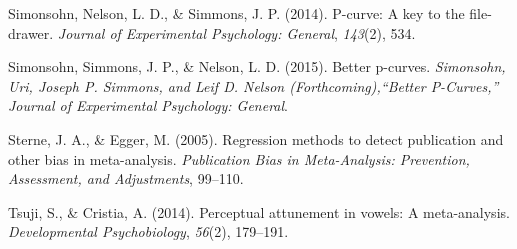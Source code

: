 \documentclass[american,floatsintext,man]{apa6}
\begin{document}
Simonsohn, Nelson, L. D., \& Simmons, J. P. (2014). P-curve: A key to
the file-drawer. \emph{Journal of Experimental Psychology: General},
\emph{143}(2), 534.

Simonsohn, Simmons, J. P., \& Nelson, L. D. (2015). Better p-curves.
\emph{Simonsohn, Uri, Joseph P. Simmons, and Leif D. Nelson
(Forthcoming),``Better P-Curves,'' Journal of Experimental Psychology:
General}.

Sterne, J. A., \& Egger, M. (2005). Regression methods to detect
publication and other bias in meta-analysis. \emph{Publication Bias in
Meta-Analysis: Prevention, Assessment, and Adjustments}, 99--110.

Tsuji, S., \& Cristia, A. (2014). Perceptual attunement in vowels: A
meta-analysis. \emph{Developmental Psychobiology}, \emph{56}(2),
179--191.
\end{document}
